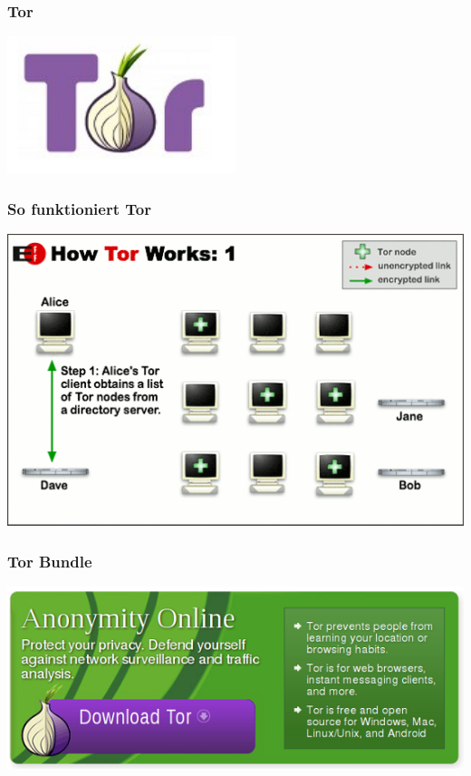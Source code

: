 
  \begin{frame}
    \frametitle{Tor}
    \includegraphics[width=0.5\textwidth, height=0.5\textheight]{img/tor.png}
  \end{frame}
  
  \begin{frame}
    \frametitle{So funktioniert Tor}
    \includegraphics[height=0.7\textheight]{img/tor1.png}
  \end{frame}
  
  \begin{frame}
    \frametitle{Tor Bundle}
    \includegraphics[width=1\textwidth, height=0.7\textheight]{img/tor_bundle.png}      
  \end{frame}


